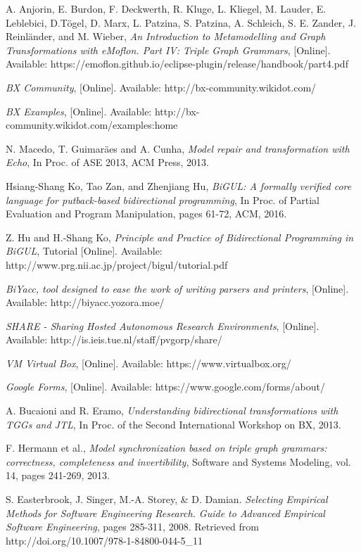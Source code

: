 \begin{thebibliography}{1}
	 A. Anjorin, E. Burdon, F. Deckwerth, R. Kluge, L. Kliegel, M. Lauder, E. Leblebici, D.T\"ogel, D. Marx, L. Patzina, S. Patzina, A. Schleich, S. E. Zander, J. Reinl\"ander, and M. Wieber, {\em An Introduction to Metamodelling and Graph Transformations with eMoflon. Part IV: Triple Graph Grammars}, [Online]. Available: 
	https://emoflon.github.io/eclipse-plugin/release/handbook/part4.pdf
	
	 {\em BX Community}, [Online]. Available: http://bx-community.wikidot.com/
	
	 {\em BX Examples}, [Online]. Available: http://bx-community.wikidot.com/examples:home
	
	 N. Macedo, T. Guimar\"aes and A. Cunha, {\em Model repair and transformation with Echo}, In Proc. of ASE 2013, ACM Press, 2013.
	
	 Hsiang-Shang Ko, Tao Zan, and Zhenjiang Hu, {\em BiGUL: A formally verified core language for putback-based bidirectional programming}, In Proc. of Partial Evaluation and Program Manipulation, pages 61-72, ACM, 2016.
	
	 Z. Hu and H.-Shang Ko,  {\em Principle and Practice of Bidirectional Programming in BiGUL}, Tutorial [Online]. Available: http://www.prg.nii.ac.jp/project/bigul/tutorial.pdf
	
	 {\em BiYacc, tool designed to ease the work of writing parsers and printers}, [Online]. Available: http://biyacc.yozora.moe/
	
	 {\em SHARE - Sharing Hosted Autonomous Research Environments}, [Online]. Available: http://is.ieis.tue.nl/staff/pvgorp/share/
	
	 {\em VM Virtual Box}, [Online]. Available: https://www.virtualbox.org/
	
	 {\em Google Forms}, [Online]. Available: https://www.google.com/forms/about/
	
	 A. Bucaioni and R. Eramo, {\em Understanding bidirectional transformations with TGGs and JTL}, In Proc. of the Second International Workshop on BX, 2013.
	
	 F. Hermann et al., {\em Model synchronization based on triple graph grammars: correctness, completeness and invertibility}, Software and Systems Modeling, vol. 14, pages 241-269, 2013.
	
	 S. Easterbrook, J. Singer, M.-A. Storey, \& D. Damian. {\em Selecting Empirical Methods for Software Engineering Research. Guide to Advanced Empirical Software Engineering}, pages 285-311, 2008. Retrieved from http://doi.org/10.1007/978-1-84800-044-5\_11
	

\end{thebibliography}
